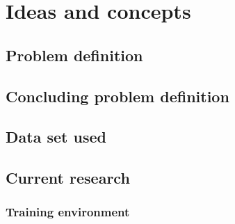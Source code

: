 \chapter{Ideas and concepts}
\label{ch:Ideas-Concepts}

\section{Problem definition}
\label{sec:Problem-Definition}

\section{Concluding problem definition}
\label{sec:Concluding-Problem-Definition}

\section{Data set used}
\label{sec:Data-Set-Used}

\section{Current research}
\label{sec:Current-Research}

\subsection{Training environment}
\label{sub:Training-Environment}
